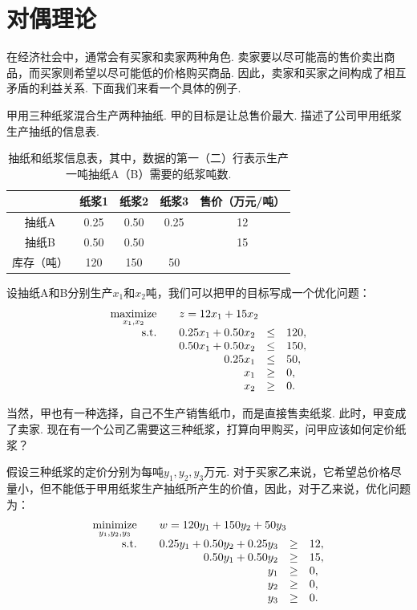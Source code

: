 \chapter{对偶理论}\label{chap:duality}

在经济社会中，通常会有买家和卖家两种角色. 卖家要以尽可能高的售价卖出商品，而买家则希望以尽可能低的价格购买商品. 因此，卖家和买家之间构成了相互矛盾的利益关系. 下面我们来看一个具体的例子. 

甲用三种纸浆混合生产两种抽纸. 甲的目标是让总售价最大.  描述了公司甲用纸浆生产抽纸的信息表. 
\begin{table}[ht]
        \centering
        \begin{tabular}{ccccc}
        \toprule
            & 纸浆1&纸浆2&纸浆3&售价（万元/吨） \\
            \midrule
             抽纸A  & 0.25&0.50&0.25&12 \\
             抽纸B  & 0.50&0.50& &15\\
             \midrule
             库存（吨）&120&150&50& \\
             \bottomrule
        \end{tabular}
        \caption{抽纸和纸浆信息表，其中，数据的第一（二）行表示生产一吨抽纸A（B）需要的纸浆吨数. }
        \label{tab:cleaner-intro}
\end{table}

设抽纸A和B分别生产$x_1$和$x_2$吨，我们可以把甲的目标写成一个优化问题：
\begin{align*}
\begin{array}{rrcl}
\displaystyle\maximize_{x_1,x_2}\quad&\multicolumn{3}{l}{z=12x_1+15x_2}\\
\text{s.t.}\quad&0.25x_1+0.50x_2&\le&120,\\
&0.50x_1+0.50x_2&\le&150,\\
&0.25x_1&\le& 50,\\
&x_1&\ge& 0,\\
&x_2&\ge& 0.
\end{array}
\end{align*}

当然，甲也有一种选择，自己不生产销售纸巾，而是直接售卖纸浆. 此时，甲变成了卖家. 现在有一个公司乙需要这三种纸浆，打算向甲购买，问甲应该如何定价纸浆？

假设三种纸浆的定价分别为每吨$y_1,y_2,y_3$万元. 对于买家乙来说，它希望总价格尽量小，但不能低于甲用纸浆生产抽纸所产生的价值，因此，对于乙来说，优化问题为：
\[
 \begin{array}{rrcl}
\displaystyle\minimize_{y_1,y_2,y_3}\quad&\multicolumn{3}{l}{w=120y_1+150y_2+50y_3} \\
\text{s.t.}\quad& 0.25y_1+0.50y_2+0.25y_3&\ge&12,\\
&0.50y_1+0.50y_2&\ge&15,\\
&y_1&\ge&0,\\
&y_2&\ge&0,\\
&y_3&\ge&0.
 \end{array}
\]

